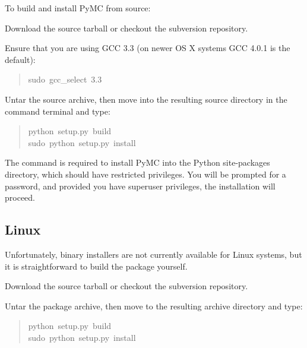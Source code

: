 To build and install PyMC from source:
\setcounter{listcnt0}{0}
\begin{list}{.}
{
\setlength{\rightmargin}{\leftmargin}
}
\item {} 
Download the source tarball or checkout the subversion repository.

\item {} 
Ensure that you are using GCC 3.3 (on newer OS X systems GCC 4.0.1 is the default):
\begin{quote}{\ttfamily \raggedright \noindent
sudo~gcc{\_}select~3.3
}\end{quote}

\item {} 
Untar the source archive, then move into the resulting source directory in
the command terminal and type:
\begin{quote}{\ttfamily \raggedright \noindent
python~setup.py~build~\\
sudo~python~setup.py~install
}\end{quote}

\end{list}

The  command is required to install PyMC into the Python site-packages
directory, which should have restricted privileges. You will be prompted for a
password, and provided you have superuser privileges, the installation will
proceed.



\hypertarget{linux}{}
\subsection*{Linux}

Unfortunately, binary installers are not currently available for Linux systems,
but it is straightforward to build the package yourself.
\setcounter{listcnt0}{0}
\begin{list}{.}
{
\setlength{\rightmargin}{\leftmargin}
}
\item {} 
Download the source tarball or checkout the subversion repository.

\item {} 
Untar the package archive, then move to the resulting archive directory and type:
\begin{quote}{\ttfamily \raggedright \noindent
python~setup.py~build~\\
sudo~python~setup.py~install
}\end{quote}

\end{list}


